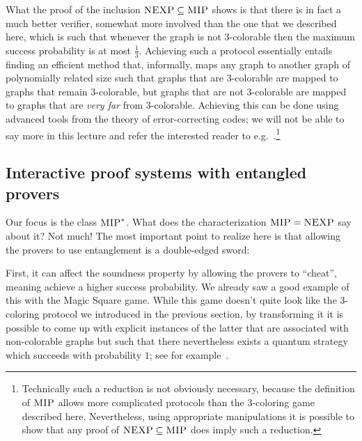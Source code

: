 What the proof of the inclusion $\textsc{NEXP} \subseteq \textsc{MIP}$ shows is that there is in fact a much better verifier, somewhat more involved than the one that we described here, which is such that whenever the graph is not $3$-colorable then the maximum success probability is at most $\frac{1}{3}$. Achieving such a protocol essentially entails finding an efficient method that, informally, maps any graph to another graph of polynomially related size such that graphs that are $3$-colorable are mapped to graphs that remain $3$-colorable, but graphs that are not $3$-colorable are mapped to graphs that are \emph{very far} from $3$-colorable. Achieving this can be done using advanced tools from the theory of error-correcting codes; we will not be able to say more in this lecture and refer the interested reader to e.g.~\cite{arora2009computational}.\footnote{Technically such a reduction is not obviously necessary, because the definition of $\textsc{MIP}$ allows more complicated protocols than the $3$-coloring game described here. Nevertheless, using appropriate manipulations it is possible to show that any proof of $\textsc{NEXP} \subseteq \textsc{MIP}$ does imply such a reduction.} 

\subsection{Interactive proof systems with entangled provers}



Our focus is the class $\textsc{MIP}^*$. What does the characterization $\textsc{MIP}= \textsc{NEXP}$ say about it? Not much! The most important point to realize here is that allowing the provers to use entanglement is a double-edged sword:

 First, it can affect the soundness property by allowing the provers to ``cheat'', meaning achieve a higher success probability. We already saw a good example of this with the Magic Square game. 
While this game doesn't quite look like the $3$-coloring protocol we  introduced in the previous section, by transforming it it is possible to come up with explicit instances of the latter that are associated with non-colorable graphs but such that there nevertheless exists a quantum strategy which succeeds with probability $1$; see for example~\cite{ji2013binary}. 

